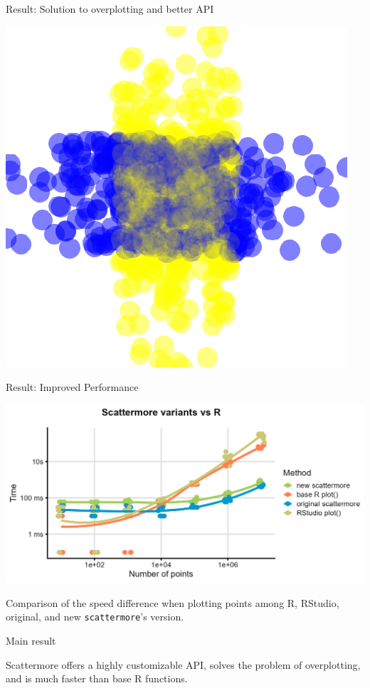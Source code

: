 \documentclass[portrait,a0paper,fontscale=0.25]{baposter}
\begin{document}
\begin{poster}
%
%
%

\begin{posterbox}[column=1, name=overplotting_api, headerColorOne=black!80, headerFontColor=white]{Result: Solution to overplotting and better API}
\begin{center}
\includegraphics[width=0.3\linewidth]{img/overplot_merge.png}
\end{center}
\end{posterbox}


\begin{posterbox}[column=1, name=plot, below=overplotting_api, headerColorOne=black!80, headerFontColor=white]{Result: Improved Performance}
\begin{center}
\includegraphics[width=0.7\linewidth]{img/version_comparison.png}
\end{center}

Comparison of the speed difference when plotting points among R, RStudio, original, and new \texttt{scattermore}’s version.
\end{posterbox}


\begin{posterbox}[column=1, name=main_result, below=plot, headerColorOne=green!90, boxColorOne=green!20]{Main result}
\large\bfseries
\vspace{1ex}
\begin{center}
Scattermore offers a highly customizable API, solves the problem of overplotting, and is much faster than base R functions.
\end{center}
\vspace{.5ex}
\end{posterbox}


\end{poster}
\end{document}
